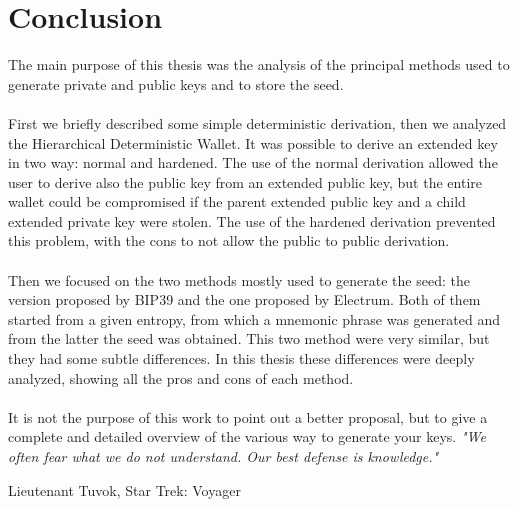 
\chapter*{Conclusion} %
\label{Conclusion} %


The main purpose of this thesis was the analysis of the principal methods used to generate private and public keys and to store the seed. 
\\ \\
First we briefly described some simple deterministic derivation, then we analyzed the Hierarchical Deterministic Wallet. It was possible to derive an extended key in two way: normal and hardened. The use of the normal derivation allowed the user to derive also the public key from an extended public key, but the entire wallet could be compromised if the parent extended public key and a child extended private key were stolen. The use of the hardened derivation prevented this problem, with the cons to not allow the public to public derivation. 
\\ \\
Then we focused on the two methods mostly used to generate the seed: the version proposed by BIP39 and the one proposed by Electrum. Both of them started from a given entropy, from which a mnemonic phrase was generated and from the latter the seed was obtained. This two method were very similar, but they had some subtle differences. In this thesis these differences were deeply analyzed, showing all the pros and cons of each method. 
\\ \\
It is not the purpose of this work to point out a better proposal, but to give a complete and detailed overview of the various way to generate your keys. 
\vfill
\textit{"We often fear what we do not understand. Our best defense is knowledge."}
\begin{flushright}
	Lieutenant Tuvok, Star Trek: Voyager
\end{flushright}

